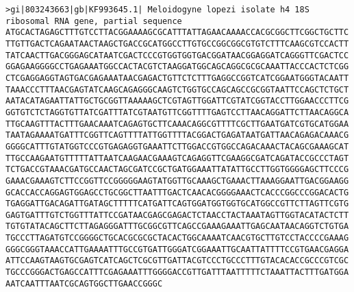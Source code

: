 \documentclass[11pt]{article}
\begin{document}
\begin{Verbatim}[commandchars=\\\{\}]
>gi|803243663|gb|KF993645.1| Meloidogyne lopezi isolate h4 18S ribosomal RNA gene, partial sequence
ATGCACTAGAGCTTTGTCCTTACGGAAAAGCGCATTTATTAGAACAAAACCACGCGGCTTCGGCTGCTTC
TTGTTGACTCAGAATAACTAAGCTGACCGCATGGCCTTGTGCCGGCGGCGTGTCTTTCAAGCGTCCACTT
TATCAACTTGACGGGAGCATAATCGACTCCCGTGGTGGTGACGGATAACGGAGGATCAGGGTTCGACTCC
GGAGAAGGGGCCTGAGAAATGGCCACTACGTCTAAGGATGGCAGCAGGCGCGCAAATTACCCACTCTCGG
CTCGAGGAGGTAGTGACGAGAAATAACGAGACTGTTCTCTTTGAGGCCGGTCATCGGAATGGGTACAATT
TAAACCCTTTAACGAGTATCAAGCAGAGGGCAAGTCTGGTGCCAGCAGCCGCGGTAATTCCAGCTCTGCT
AATACATAGAATTATTGCTGCGGTTAAAAAGCTCGTAGTTGGATTCGTATCGGTACCTTGGAACCCTTCG
GGTGTCTCTAGGTGTTATCGATTTATCGTAATGTTCGGTTTTGAGTCCTTAACAGGATTCTTAACAGGCA
TTGCAAGTTTACTTTGAACAAATCAGAGTGCTTCAAACAGGCGTTTTCGCTTGAATGATCGTGCATGGAA
TAATAGAAAATGATTTCGGTTCAGTTTTATTGGTTTTACGGACTGAGATAATGATTAACAGAGACAAACG
GGGGCATTTGTATGGTCCCGTGAGAGGTGAAATTCTTGGACCGTGGCCAGACAAACTACAGCGAAAGCAT
TTGCCAAGAATGTTTTTATTAATCAAGAACGAAAGTCAGAGGTTCGAAGGCGATCAGATACCGCCCTAGT
TCTGACCGTAAACGATGCCAACTAGCGATCCGCTGATGGAAATTATATTGCCTTGGTGGGGAGCTTCCCG
GAAACGAAAGTCTTCCGGTTCCGGGGGAAGTATGGTTGCAAAGCTGAAACTTAAAGGAATTGACGGAAGG
GCACCACCAGGAGTGGAGCCTGCGGCTTAATTTGACTCAACACGGGGAAACTCACCCGGCCCGGACACTG
TGAGGATTGACAGATTGATAGCTTTTTCATGATTCAGTGGATGGTGGTGCATGGCCGTTCTTAGTTCGTG
GAGTGATTTGTCTGGTTTATTCCGATAACGAGCGAGACTCTAACCTACTAAATAGTTGGTACATACTCTT
TGTGTATACAGCTTCTTAGAGGGATTTGCGGCGTTCAGCCGAAAGAAATTGAGCAATAACAGGTCTGTGA
TGCCCTTAGATGTCCGGGGCTGCACGCGCGCTACACTGGCAAAATCAACGTGCTTGTCCTACCCCGAAAG
GGGCGGGTAAACCATTGAAAATTTGCCGTGATTGGGATCGGAAATTGCAATTATTTTCCGTGAACGAGGA
ATTCCAAGTAAGTGCGAGTCATCAGCTCGCGTTGATTACGTCCCTGCCCTTTGTACACACCGCCCGTCGC
TGCCCGGGACTGAGCCATTTCGAGAAATTTGGGGACCGTTGATTTAATTTTTCTAAATTACTTTGATGGA
AATCAATTTAATCGCAGTGGCTTGAACCGGGC


\end{Verbatim}
\end{document}

